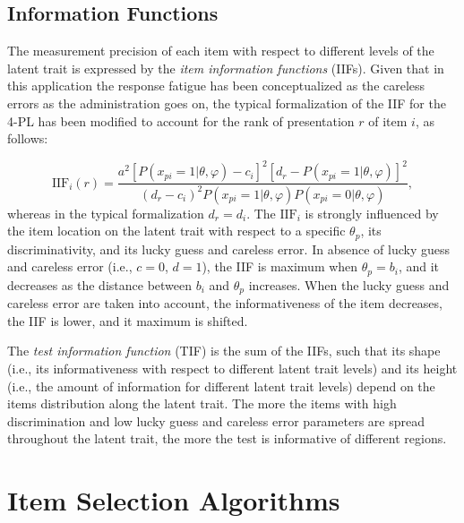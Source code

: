\documentclass{svproc}
\begin{document}
\subsection{Information Functions}

The measurement precision of each item with respect to different levels of the latent trait is expressed by the \emph{item information functions} (IIFs). 
\color{blue}
Given that in this application the response fatigue has been conceptualized as the careless errors as the administration goes on, the typical formalization of the IIF for the 4-PL \cite{magis:iif} has been modified to account for the rank of presentation $r$ of item $i$, as follows:
\normalcolor


\begin{equation}\label{eq:iif}
	\text{IIF}_{i}(r) = \dfrac{a^2[P(x_{pi}=1|\theta, \varphi)-c_i]^2[d_r - P(x_{pi}=1|\theta, \varphi)]^2}{(d_{r}-c_i)^2 P(x_{pi}=1|\theta, \varphi)P(x_{pi}=0|\theta, \varphi)}, 
\end{equation}
whereas in the typical formalization $d_r = d_i$.
The $\text{IIF}_i$ is strongly influenced by the item location on the latent trait with respect to a specific $\theta_p$, its discriminativity, and its lucky guess and careless error. In absence of lucky guess and careless error (i.e., $c = 0$, $d = 1$), the IIF is maximum when  $\theta_p = b_i$, and it decreases as the distance between $b_i$ and $\theta_p$ increases. When the lucky guess and careless error are taken into account, the informativeness of the item decreases, the IIF is lower, and it maximum is shifted. 

The \emph{test information function} (TIF) is the sum of the IIFs, such that its shape (i.e., its informativeness with respect to different latent trait levels) and its height (i.e., the amount of information for different latent trait levels) depend on the items distribution along the latent trait. The more the items with high discrimination and low lucky guess and careless error parameters are spread throughout the latent trait, the more the test is informative of different regions. 


\section{Item Selection Algorithms}
\end{document}
